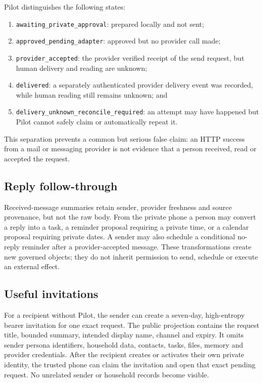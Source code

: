 Pilot distinguishes the following states:
\begin{enumerate}
  \item \texttt{awaiting\_private\_approval}: prepared locally and not sent;
  \item \texttt{approved\_pending\_adapter}: approved but no provider call made;
  \item \texttt{provider\_accepted}: the provider verified receipt of the send
        request, but human delivery and reading are unknown;
  \item \texttt{delivered}: a separately authenticated provider delivery event was
        recorded, while human reading still remains unknown; and
  \item \texttt{delivery\_unknown\_reconcile\_required}: an attempt may have happened
        but Pilot cannot safely claim or automatically repeat it.
\end{enumerate}
This separation prevents a common but serious false claim: an HTTP success from a
mail or messaging provider is not evidence that a person received, read or accepted
the request.

\subsection{Reply follow-through}

Received-message summaries retain sender, provider freshness and source provenance,
but not the raw body.  From the private phone a person may convert a reply into a
task, a reminder proposal requiring a private time, or a calendar proposal requiring
private dates.  A sender may also schedule a conditional no-reply reminder after a
provider-accepted message.  These transformations create new governed objects; they
do not inherit permission to send, schedule or execute an external effect.

\subsection{Useful invitations}

For a recipient without Pilot, the sender can create a seven-day, high-entropy bearer
invitation for one exact request.  The public projection contains the request title,
bounded summary, intended display name, channel and expiry.  It omits sender persona
identifiers, household data, contacts, tasks, files, memory and provider credentials.
After the recipient creates or activates their own private identity, the trusted phone
can claim the invitation and open that exact pending request.  No unrelated sender or
household records become visible.

